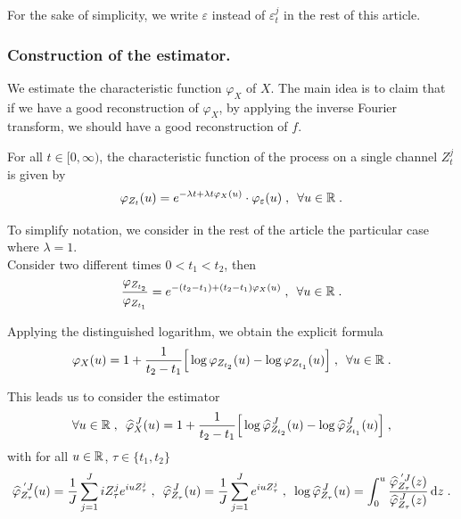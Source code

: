 For the sake of simplicity, we write $\varepsilon$ instead of $\varepsilon_t^j$ in the rest of this article.

\subsubsection*{Construction of the estimator.}
We estimate the characteristic function $\varphi_X$ of $X$. The main idea is to claim that if we have a good reconstruction of $\varphi_X$, by applying the inverse Fourier transform, we should have a good reconstruction of $f$. 

For all $t \in [0, \infty)$,  the characteristic function of the process on a single channel $Z_t^j$ is given by
    \begin{equation}
         \varphi_{Z_t}(u) = e^{- \lambda t + \lambda t \varphi_X(u)} 
        \cdot \varphi_\varepsilon(u)
        \; , \enspace
        \forall u \in \mathbb{R}
        \; .
        \label{eq:fctcar_un_canal_bruit}
    \end{equation}


    To simplify notation, we consider in the rest of the article the particular case where $\lambda = 1$. \\

    
Consider two different times $0 < t_1 < t_2$, then
    \begin{equation*}
        \frac{\varphi_{Z_{t_2}}}{\varphi_{Z_{t_1}}}
        = 
        e^{
            - (t_2 - t_1) 
            + (t_2 - t_1) \varphi_X(u)}
    \; , \enspace
    \forall u \in \mathbb{R}
    \; .
    \end{equation*}

Applying the distinguished logarithm, we obtain the explicit formula
    \begin{equation*}
        \varphi_X (u)
        = 1 + \frac{1}{t_2 - t_1} \Big[  \log \varphi_{Z_{t_2}} (u) - \log \varphi_{Z_{t_1}} 		        (u) \Big]
    \; , \enspace
    \forall u \in \mathbb{R}
    \; .
    \label{reconstruction_exacte_fctcar}
    \end{equation*}

This leads us to consider the estimator
    \begin{equation*}
        \forall u \in \mathbb{R}
        \; , \enspace
        \widehat \varphi_X^{\, J} (u)
        = 1 + \frac{1}{t_2 - t_1} \Big[  \log \widehat \varphi_{Z_{t_2}}^{\, J} (u) - \log 		   
        \widehat \varphi_{Z_{t_1}}^{\, J} (u) \Big]
        \; ,
    \end{equation*}
    with for all $u \in \mathbb{R}$, $\tau \in \{t_1, t_2\}$
    \begin{equation*}
    	\widehat \varphi_{Z_{\tau}}^{\; ' J} (u) = \frac{1}{J} \sum_{j = 1}^J i Z_{\tau}^j e^{i u Z_{\tau}^j}
    \; , \enspace
    \widehat \varphi_{Z_{\tau}}^{\, J} (u) = \frac{1}{J} \sum_{j = 1}^J e^{i u Z_{\tau}^j}
    \; , \enspace
    \log \widehat \varphi_{Z_{\tau}}^{\, J} (u) = \int_0^u \frac{\widehat \varphi_{Z_{\tau}}^{\; ' J} (z)}{\widehat \varphi_{Z_{\tau}}^{\, J} (z)} \, \mathrm dz
    \; .
    \label{def:estimateur_fctcar}
    \end{equation*}


